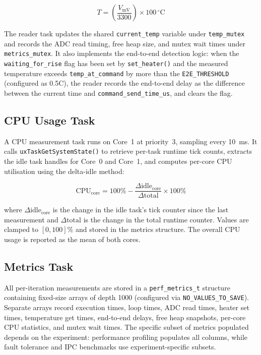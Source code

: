 \documentclass[12pt, a4paper]{report}
\begin{document}
\begin{equation}
\label{eq:temp_conversion}
T = \left( \frac{V_{\text{mV}}}{3300} \right) \times 100 \, ^\circ\text{C}
\end{equation}

The reader task updates the shared \texttt{current\_temp} variable under \texttt{temp\_mutex} and records the ADC read timing, free heap size, and mutex wait times under \texttt{metrics\_mutex}. It also implements the end-to-end detection logic: when the \texttt{waiting\_for\_rise} flag has been set by \texttt{set\_heater()} and the measured temperature exceeds \texttt{temp\_at\_command} by more than the \texttt{E2E\_THRESHOLD} (configured as 0.5\textdegree C), the reader records the end-to-end delay as the difference between the current time and \texttt{command\_send\_time\_us}, and clears the flag.

\subsection{CPU Usage Task}
\label{subsec:native-cpu}

A CPU measurement task runs on Core~1 at priority~3, sampling every 10~ms. It calls \texttt{uxTaskGetSystemState()} to retrieve per-task runtime tick counts, extracts the idle task handles for Core~0 and Core~1, and computes per-core CPU utilisation using the delta-idle method:

\begin{equation}
\label{eq:cpu}
\text{CPU}_{\text{core}} = 100\% - \frac{\Delta \text{idle}_{\text{core}}}{\Delta \text{total}} \times 100\%
\end{equation}

\noindent where $\Delta \text{idle}_{\text{core}}$ is the change in the idle task's tick counter since the last measurement and $\Delta \text{total}$ is the change in the total runtime counter. Values are clamped to $[0, 100]$\% and stored in the metrics structure. The overall CPU usage is reported as the mean of both cores.

\subsection{Metrics Task}
\label{subsec:native-metrics}

All per-iteration measurements are stored in a \texttt{perf\_metrics\_t} structure containing fixed-size arrays of depth 1000 (configured via \texttt{NO\_VALUES\_TO\_SAVE}). Separate arrays record execution times, loop times, ADC read times, heater set times, temperature get times, end-to-end delays, free heap snapshots, per-core CPU statistics, and mutex wait times. The specific subset of metrics populated depends on the experiment: performance profiling populates all columns, while fault tolerance and IPC benchmarks use experiment-specific subsets.
\end{document}
